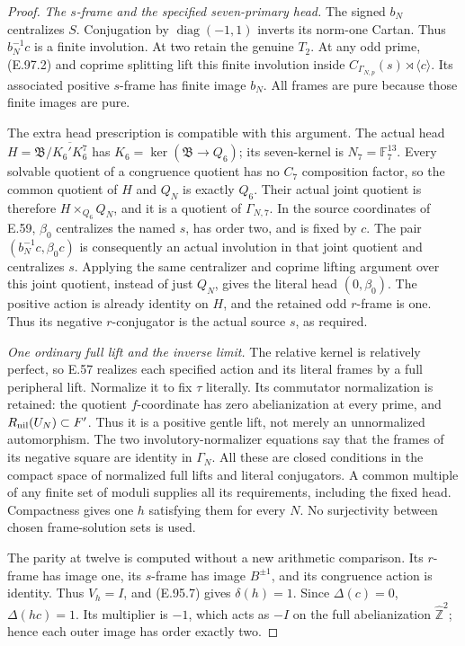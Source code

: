 \begin{proof}
\emph{The \(s\)-frame and the specified seven-primary head.}
The signed \(b_N\) centralizes \(S\).
Conjugation by \(\operatorname{diag}(-1,1)\) inverts its
norm-one Cartan.  Thus \(b_N^{-1}c\) is a finite involution.
At two retain the genuine \(T_2\).  At any odd prime,
(E.97.2) and coprime splitting lift this finite involution
inside \(C_{\Gamma_{N,p}}(s)\rtimes\langle c\rangle\).
Its associated positive \(s\)-frame has finite image \(b_N\).
All frames are pure because those finite images are pure.

The extra head prescription is compatible with this argument.
The actual head \(H=\mathfrak B/\overline{K_6'K_6^7}\)
has \(K_6=\ker(\mathfrak B\to Q_6)\); its seven-kernel is
\(N_7=\mathbb F_7^{13}\).  Every solvable quotient of a
congruence quotient has no \(C_7\) composition factor, so the common quotient of \(H\)
and \(Q_N\) is exactly \(Q_6\).  Their actual joint quotient is
therefore \(H\times_{Q_6}Q_N\), and it is a quotient of
\(\Gamma_{N,7}\).
In the source coordinates of E.59, \(\beta_0\) centralizes
the named \(s\), has order two, and is fixed by \(c\).
The pair \((b_N^{-1}c,\beta_0c)\) is consequently an actual
involution in that joint quotient and centralizes \(s\).
Applying the same centralizer and coprime lifting argument
over this joint quotient, instead of just \(Q_N\), gives the
literal head \((0,\beta_0)\).
The positive action is already identity on \(H\), and the
retained odd \(r\)-frame is one.  Thus its negative
\(r\)-conjugator is the actual source \(s\), as required.

\emph{One ordinary full lift and the inverse limit.}
The relative kernel is relatively perfect, so E.57 realizes
each specified action and its literal frames by a full
peripheral lift.  Normalize it to fix \(\tau\) literally.
Its commutator normalization is retained: the quotient
\(f\)-coordinate has zero abelianization at every prime, and
\(R_{\rm nil}(U_N)\subset F'\).  Thus it is a positive
gentle lift, not merely an unnormalized automorphism.
The two involutory-normalizer equations say that the
frames of its negative square are identity in \(\Gamma_N\).
All these are closed conditions in the compact space of
normalized full lifts and literal conjugators.
A common multiple of any finite set of moduli supplies
all its requirements, including the fixed head.
Compactness gives one \(h\) satisfying them for every \(N\).
No surjectivity between chosen frame-solution sets is used.

The parity at twelve is computed without a new arithmetic
comparison.  Its \(r\)-frame has image one, its \(s\)-frame
has image \(B^{\pm1}\), and its congruence action is identity.
Thus \(V_h=I\), and (E.95.7) gives \(\delta(h)=1\).
Since \(\Delta(c)=0\), \(\Delta(hc)=1\).
Its multiplier is \(-1\), which acts as \(-I\) on the full
abelianization \(\widehat{\mathbb Z}^2\); hence each outer
image has order exactly two.


\end{proof}
